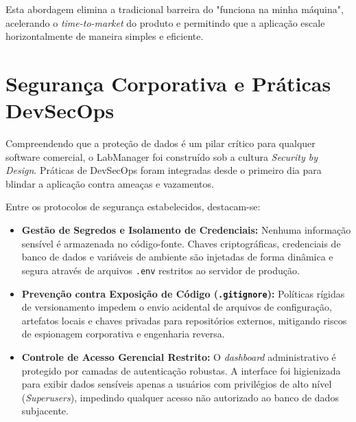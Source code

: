 \documentclass[12pt,a4paper]{article}
\begin{document}
	Esta abordagem elimina a tradicional barreira do "funciona na minha máquina", acelerando o \textit{time-to-market} do produto e permitindo que a aplicação escale horizontalmente de maneira simples e eficiente.
	
	
	\section{Segurança Corporativa e Práticas DevSecOps}
	
	Compreendendo que a proteção de dados é um pilar crítico para qualquer software comercial, o LabManager foi construído sob a cultura \textit{Security by Design}. Práticas de DevSecOps foram integradas desde o primeiro dia para blindar a aplicação contra ameaças e vazamentos.
	
	Entre os protocolos de segurança estabelecidos, destacam-se:
	
	\begin{itemize}
		
		\item \textbf{Gestão de Segredos e Isolamento de Credenciais:} Nenhuma informação sensível é armazenada no código-fonte. Chaves criptográficas, credenciais de banco de dados e variáveis de ambiente são injetadas de forma dinâmica e segura através de arquivos \texttt{.env} restritos ao servidor de produção.
		
		\item \textbf{Prevenção contra Exposição de Código (\texttt{.gitignore}):} Políticas rígidas de versionamento impedem o envio acidental de arquivos de configuração, artefatos locais e chaves privadas para repositórios externos, mitigando riscos de espionagem corporativa e engenharia reversa.
		
		\item \textbf{Controle de Acesso Gerencial Restrito:} O \textit{dashboard} administrativo é protegido por camadas de autenticação robustas. A interface foi higienizada para exibir dados sensíveis apenas a usuários com privilégios de alto nível (\textit{Superusers}), impedindo qualquer acesso não autorizado ao banco de dados subjacente.
		
	\end{itemize}
	
	
\end{document}
